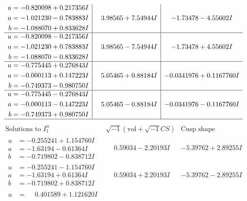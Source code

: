 \documentclass[1p]{elsarticle_modified}
\theoremstyle{definition}
\newcommand{\I}{\sqrt{-1}}
\begin{document}
$$\begin{array}{c|c|c}
\begin{aligned}
u &= -0.820098 + 0.217356 I \\
a &= -1.021230 - 0.783883 I \\
b &= -1.088070 + 0.833628 I\end{aligned}
 & \phantom{-}3.98565 + 7.54944 I & -1.73478 - 4.55602 I \\ \hline\begin{aligned}
u &= -0.820098 - 0.217356 I \\
a &= -1.021230 + 0.783883 I \\
b &= -1.088070 - 0.833628 I\end{aligned}
 & \phantom{-}3.98565 - 7.54944 I & -1.73478 + 4.55602 I \\ \hline\begin{aligned}
u &= -0.775445 + 0.276843 I \\
a &= -0.000113 + 0.147223 I \\
b &= -0.749373 - 0.980750 I\end{aligned}
 & \phantom{-}5.05465 + 0.88184 I & -0.0341976 + 0.1167760 I \\ \hline\begin{aligned}
u &= -0.775445 - 0.276843 I \\
a &= -0.000113 - 0.147223 I \\
b &= -0.749373 + 0.980750 I\end{aligned}
 & \phantom{-}5.05465 - 0.88184 I & -0.0341976 - 0.1167760 I\\
 \hline 
 \end{array}$$\newpage$$\begin{array}{c|c|c}  
\text{Solutions to }I^u_{1}& \I (\text{vol} + \sqrt{-1}CS) & \text{Cusp shape}\\
 \hline 
\begin{aligned}
u &= -0.255241 + 1.154760 I \\
a &= -1.63194 - 0.61364 I \\
b &= -0.719802 - 0.838712 I\end{aligned}
 & \phantom{-}0.59034 - 2.20193 I & -5.39762 + 2.89255 I \\ \hline\begin{aligned}
u &= -0.255241 - 1.154760 I \\
a &= -1.63194 + 0.61364 I \\
b &= -0.719802 + 0.838712 I\end{aligned}
 & \phantom{-}0.59034 + 2.20193 I & -5.39762 - 2.89255 I \\ \hline\begin{aligned}
u &= \phantom{-}0.401589 + 1.121620 I \\

\end{aligned}
\end{array}$$
\end{document}
